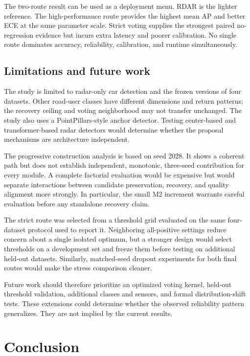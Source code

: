\documentclass[preprint,12pt,times]{elsarticle}
\begin{document}
The two-route result can be used as a deployment menu. RDAR is the lighter
reference. The high-performance route provides the highest mean AP and better
ECE at the same parameter scale. Strict voting supplies the strongest paired
no-regression evidence but incurs extra latency and poorer calibration. No
single route dominates accuracy, reliability, calibration, and runtime
simultaneously.

\subsection{Limitations and future work}

The study is limited to radar-only car detection and the frozen versions of
four datasets. Other road-user classes have different dimensions and return
patterns; the recovery ceiling and voting neighborhood may not transfer
unchanged. The study also uses a PointPillars-style anchor detector. Testing
center-based and transformer-based radar detectors would determine whether the
proposal mechanisms are architecture independent.

The progressive construction analysis is based on seed 2028. It shows a coherent
path but does not establish independent, monotonic, three-seed contribution
for every module. A complete factorial evaluation would be expensive but would
separate interactions between candidate preservation, recovery, and quality
alignment more strongly. In particular, the small M2 increment warrants
careful evaluation before any standalone recovery claim.

The strict route was selected from a threshold grid evaluated on the same
four-dataset protocol used to report it. Neighboring all-positive settings
reduce concern about a single isolated optimum, but a stronger design would
select thresholds on a development set and freeze them before testing on
additional held-out datasets. Similarly, matched-seed dropout experiments for
both final routes would make the stress comparison cleaner.

Future work should therefore prioritize an optimized voting kernel, held-out
threshold validation, additional classes and sensors, and formal
distribution-shift tests. These extensions could determine whether the
observed reliability pattern generalizes. They are not implied by the current
results.

\section{Conclusion}
\end{document}
